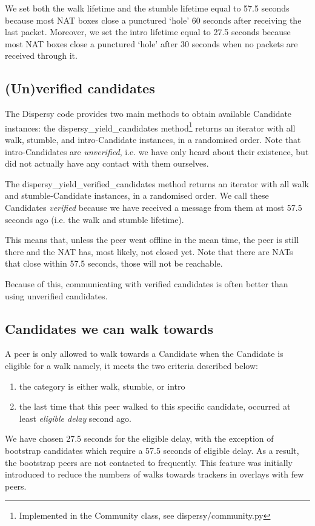 We set both the walk lifetime and the stumble lifetime equal to 57.5
seconds because most NAT boxes close a punctured ‘hole’ 60 seconds
after receiving the last packet.  Moreover, we set the intro lifetime
equal to 27.5 seconds because most NAT boxes close a punctured ‘hole’
after 30 seconds when no packets are received through
it\footnotemark[1]{}.
\subsection{(Un)verified candidates}
\label{sec-2-2}
The Dispersy code provides two main methods to obtain available
Candidate instances: the dispersy\_yield\_candidates
method\footnote{Implemented in the Community class, see dispersy/community.py} returns an iterator with all walk, stumble, and
intro-Candidate instances, in a randomised order.  Note that
intro-Candidates are \emph{unverified}, i.e. we have only heard about their
existence, but did not actually have any contact with them ourselves.

The dispersy\_yield\_verified\_candidates method\footnotemark[3]{} returns an
iterator with all walk and stumble-Candidate instances, in a
randomised order.  We call these Candidates \emph{verified} because we have
received a message from them at most 57.5 seconds ago (i.e. the walk
and stumble lifetime).

This means that, unless the peer went offline in the mean time, the
peer is still there and the NAT has, most likely, not closed yet.
Note that there are NATs that close within 57.5
seconds\footnotemark[1]{}, those will not be reachable.

Because of this, communicating with verified candidates is often
better than using unverified candidates.
\subsection{Candidates we can walk towards}
\label{sec-2-3}
A peer is only allowed to walk towards a Candidate when the Candidate
is eligible for a walk namely, it meets the two criteria described
below:
\begin{enumerate}
\item the category is either walk, stumble, or intro
\item the last time that this peer walked to this specific candidate,
occurred at least \emph{eligible delay} second ago.
\end{enumerate}

We have chosen 27.5 seconds for the eligible delay, with the exception
of bootstrap candidates which require a 57.5 seconds of eligible
delay.  As a result, the bootstrap peers are not contacted to
frequently.  This feature was initially introduced to reduce the
numbers of walks towards trackers in overlays with few peers.
